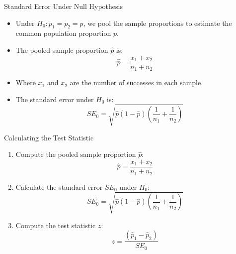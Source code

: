 \documentclass[handout]{beamer} %
\begin{document}
\begin{frame}{Standard Error Under Null Hypothesis}
  \begin{itemize}
    \item Under $H_0: p_1 = p_2 = p$, we pool the sample proportions to estimate the common population proportion $p$.
    \item The pooled sample proportion $\hat{p}$ is:
    \[
    \hat{p} = \frac{x_1 + x_2}{n_1 + n_2}
    \]
    \item Where $x_1$ and $x_2$ are the number of successes in each sample.
    \item The standard error under $H_0$ is:
    \[
    SE_0 = \sqrt{\hat{p}(1 - \hat{p})\left( \frac{1}{n_1} + \frac{1}{n_2} \right)}
    \]
  \end{itemize}
\end{frame}

\begin{frame}{Calculating the Test Statistic}
  \begin{enumerate}
    \item Compute the pooled sample proportion $\hat{p}$:
    \[
    \hat{p} = \frac{x_1 + x_2}{n_1 + n_2}
    \]
    \item Calculate the standard error $SE_0$ under $H_0$:
    \[
    SE_0 = \sqrt{\hat{p}(1 - \hat{p})\left( \frac{1}{n_1} + \frac{1}{n_2} \right)}
    \]
    \item Compute the test statistic $z$:
    \[
    z = \frac{(\hat{p}_1 - \hat{p}_2)}{SE_0}
    \]
  \end{enumerate}
\end{frame}
\end{document}
